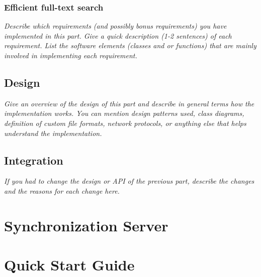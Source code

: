 \documentclass[a4paper,12pt]{article}
\begin{document}
\subsubsection{Efficient full-text search}

\emph{Describe which requirements (and possibly bonus requirements) you have implemented in this part. Give a quick description (1-2 sentences) of each requirement. List the software elements (classes and or functions) that are mainly involved in implementing each requirement.}


\subsection{Design}

\emph{Give an overview of the design of this part and describe in general terms how the implementation works. You can mention design patterns used, class diagrams, definition of custom file formats, network protocols, or anything else that helps understand the implementation.}


\subsection{Integration}

\emph{If you had to change the design or API of the previous part, describe the changes and the reasons for each change here.}




\section{Synchronization Server}





\section{Quick Start Guide}


\end{document}
